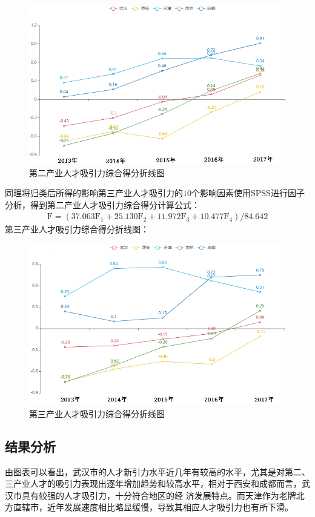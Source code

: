\documentclass{whutmod}
\begin{document}
	\begin{figure}[H]
		\centering
		\includegraphics[width=\textwidth]{figures/22.png}
		\caption{第二产业人才吸引力综合得分折线图}\label{22}
	\end{figure}
	
	同理将归类后所得的影响第三产业人才吸引力的$10$个影响因素使用SPSS进行因子分析，得到第二产业人才吸引力综合得分计算公式：
	\begin{gather}
	\mathrm { F } = \left( 37.063 \mathrm { F } _ { 1 } + 25.130 \mathrm { F } _ { 2 } + 11.972 \mathrm { F } _ { 3 } + 10.477 \mathrm { F } _ { 4 } \right) / 84.642
	\end{gather}
	第三产业人才吸引力综合得分折线图：
		\begin{figure}[H]
		\centering
		\includegraphics[width=\textwidth]{figures/33.png}
		\caption{第三产业人才吸引力综合得分折线图}\label{33}
	\end{figure}

	\subsection{结果分析}
	由图表可以看出，武汉市的人才新引力水平近几年有较高的水平，尤其是对第二、三产业人才的吸引力表现出逐年增加趋势和较高水平，相对于西安和成都而言，武汉市具有较强的人才吸引力，十分符合地区的经
	济发展特点。而天津作为老牌北方直辖市，近年发展速度相比略显缓慢，导致其相应人才吸引力也有所下滑。
	
\end{document}

